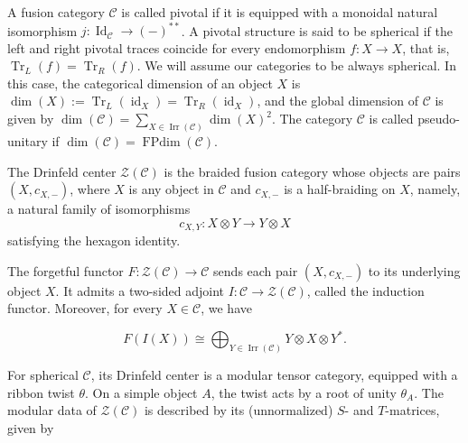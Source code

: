 \documentclass[a4paper,twoside,11pt]{amsart}
\theoremstyle{plain} %
\theoremstyle{definition}
\begin{document}
A fusion category $\mathcal{C}$ is called pivotal if it is equipped with a monoidal natural isomorphism $j:\operatorname{Id}_{\mathcal{C}}\to(-)^{**}$. A pivotal structure is said to be spherical if the left and right pivotal traces coincide for every endomorphism $f:X\to X$, that is, $\operatorname{Tr}_L(f)=\operatorname{Tr}_R(f)$. We will assume our categories to be always spherical. In this case, the categorical dimension of an object $X$ is $\dim(X):=\operatorname{Tr}_L(\operatorname{id}_X)
=\operatorname{Tr}_R(\operatorname{id}_X)$, and the global dimension of $\mathcal{C}$ is given by $
\dim(\mathcal{C})=\sum_{X\in\operatorname{Irr}(\mathcal{C})}\dim(X)^2$. The category $\mathcal{C}$ is called pseudo-unitary if $\dim(\mathcal{C})=\operatorname{FPdim}(\mathcal{C})$. \bigskip



The Drinfeld center $\mathcal{Z}(\mathcal{C})$ is the braided fusion category whose objects are pairs $(X,c_{X,-})$, where $X
$ is any object in $\mathcal{C}$ and $c_{X,-}$ is a half-braiding on $X$, namely, a natural family of isomorphisms
$$
c_{X,Y}: X\otimes Y\longrightarrow Y\otimes X
$$
satisfying the hexagon identity.
\bigskip



The forgetful functor $F:\mathcal{Z}(\mathcal{C})\to\mathcal{C}$ sends each pair $(X,c_{X,-})$ to its underlying object $X$. It admits a two-sided adjoint $I:\mathcal{C}\to\mathcal{Z}(\mathcal{C})$, called the induction functor. Moreover, for every $X\in\mathcal{C}$, we have

$$
F(I(X))\cong
\bigoplus_{Y\in\operatorname{Irr}(\mathcal{C})}
Y\otimes X\otimes Y^*.
$$

For spherical $\mathcal{C}$, its Drinfeld center is a modular tensor category, equipped with a ribbon twist $\theta$. On a simple object $A$, the twist acts by a root of unity $\theta_A$. The modular data of $\mathcal{Z}(\mathcal{C})$ is described by its (unnormalized) $S$- and $T$-matrices, given by
\end{document}
